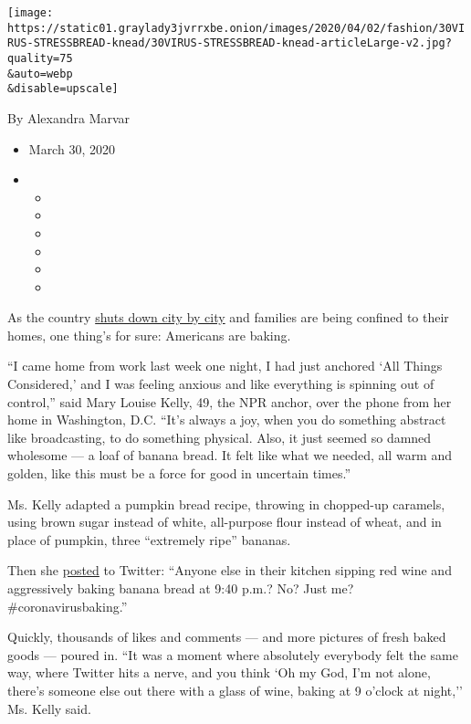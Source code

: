 \texttt{[image: https://static01.graylady3jvrrxbe.onion/images/2020/04/02/fashion/30VIRUS-STRESSBREAD-knead/30VIRUS-STRESSBREAD-knead-articleLarge-v2.jpg?quality=75\\\&auto=webp\\\&disable=upscale]}

By Alexandra Marvar

\begin{itemize}
\item
  March 30, 2020
\item
  \begin{itemize}
  \item
  \item
  \item
  \item
  \item
  \item
  \end{itemize}
\end{itemize}

As the country
\href{https://www.nytimes3xbfgragh.onion/interactive/2020/us/coronavirus-stay-at-home-order.html}{shuts
down city by city} and families are being confined to their homes, one
thing's for sure: Americans are baking.

``I came home from work last week one night, I had just anchored `All
Things Considered,' and I was feeling anxious and like everything is
spinning out of control,'' said Mary Louise Kelly, 49, the NPR anchor,
over the phone from her home in Washington, D.C. ``It's always a joy,
when you do something abstract like broadcasting, to do something
physical. Also, it just seemed so damned wholesome --- a loaf of banana
bread. It felt like what we needed, all warm and golden, like this must
be a force for good in uncertain times.''

Ms. Kelly adapted a pumpkin bread recipe, throwing in chopped-up
caramels, using brown sugar instead of white, all-purpose flour instead
of wheat, and in place of pumpkin, three ``extremely ripe'' bananas.

Then she
\href{https://twitter.com/NPRKelly/status/1240452816117866496}{posted}
to Twitter: ``Anyone else in their kitchen sipping red wine and
aggressively baking banana bread at 9:40 p.m.? No? Just me?
\#coronavirusbaking.''

Quickly, thousands of likes and comments --- and more pictures of fresh
baked goods --- poured in. ``It was a moment where absolutely everybody
felt the same way, where Twitter hits a nerve, and you think `Oh my God,
I'm not alone, there's someone else out there with a glass of wine,
baking at 9 o'clock at night,'' Ms. Kelly said.

